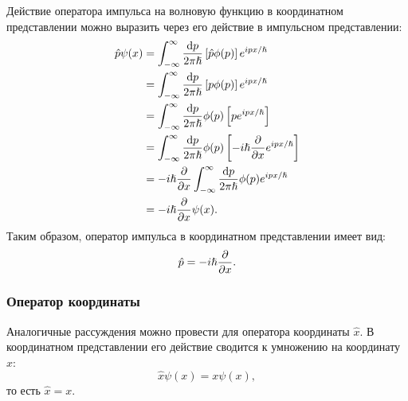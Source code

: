 \documentclass[a4paper, 12pt]{article}
\begin{document}
Действие оператора импульса на волновую функцию в координатном представлении можно выразить через его действие в импульсном представлении:
\begin{align}
    \hat{p} \psi(x) &= \int_{-\infty}^{\infty} \frac{\dd{p}}{2\pi\hslash} \left[\hat{p} \phi(p)\right] e^{i p x / \hslash} \nonumber \\
                    &= \int_{-\infty}^{\infty} \frac{\dd{p}}{2\pi\hslash} \left[p \phi(p)\right] e^{i p x / \hslash} \nonumber \\
                    &= \int_{-\infty}^{\infty} \frac{\dd{p}}{2\pi\hslash} \phi(p) \left[p e^{i p x / \hslash}\right] \nonumber \\
                    &= \int_{-\infty}^{\infty} \frac{\dd{p}}{2\pi\hslash} \phi(p) \left[-i\hslash \pdv{x} e^{i p x / \hslash}\right] \nonumber \\
                    &= -i\hslash \pdv{x} \int_{-\infty}^{\infty} \frac{\dd{p}}{2\pi\hslash} \phi(p) e^{i p x / \hslash} \nonumber \\
                    &= -i\hslash \pdv{x} \psi(x).
\end{align}
Таким образом, оператор импульса в координатном представлении имеет вид:
\begin{equation}
    \hat{p} = -i \hslash \pdv{x}. \label{eq:p_in_x_rep}
\end{equation}

\subsubsection*{Оператор координаты}

Аналогичные рассуждения можно провести для оператора координаты $\hat{x}$. В координатном представлении его действие сводится к умножению на координату $x$:
\begin{equation}
    \hat{x} \psi(x) = x \psi(x), \label{eq:x_in_x_rep}
\end{equation}
то есть $\hat{x} = x$.
\end{document}
